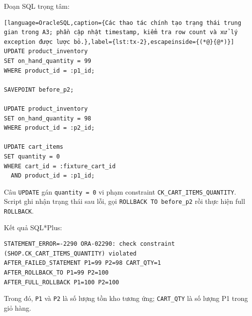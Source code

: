 Đoạn SQL trọng tâm:

\reportblockspace{72pt}
\begin{lstlisting}[language=OracleSQL,caption={Các thao tác chính tạo trạng thái trung gian trong A3; phần cập nhật timestamp, kiểm tra row count và xử lý exception được lược bỏ.},label={lst:tx-2},escapeinside={(*@}{@*)}]
UPDATE product_inventory
SET on_hand_quantity = 99
WHERE product_id = :p1_id;

SAVEPOINT before_p2;

UPDATE product_inventory
SET on_hand_quantity = 98
WHERE product_id = :p2_id;

UPDATE cart_items
SET quantity = 0
WHERE cart_id = :fixture_cart_id
  AND product_id = :p1_id;
\end{lstlisting}

Câu \texttt{UPDATE} gán \texttt{quantity =\allowbreak{} 0} vi phạm constraint \texttt{CK\_\allowbreak{}CART\_\allowbreak{}ITEMS\_\allowbreak{}QUANTITY}. Script ghi nhận trạng thái sau lỗi, gọi \texttt{ROLLBACK TO before\_\allowbreak{}p2} rồi thực hiện full \texttt{ROLLBACK}.

Kết quả SQL*Plus:

\reportblockspace{72pt}
\begingroup
{}\label{result:tx-1}
\nopagebreak[4]
\begin{Verbatim}
STATEMENT_ERROR=-2290 ORA-02290: check constraint
(SHOP.CK_CART_ITEMS_QUANTITY) violated
AFTER_FAILED_STATEMENT P1=99 P2=98 CART_QTY=1
AFTER_ROLLBACK_TO P1=99 P2=100
AFTER_FULL_ROLLBACK P1=100 P2=100
\end{Verbatim}
\endgroup\par\smallskip
Trong đó, \texttt{P1} và \texttt{P2} là số lượng tồn kho tương ứng; \texttt{CART\_\allowbreak{}QTY} là số lượng P1 trong giỏ hàng.

